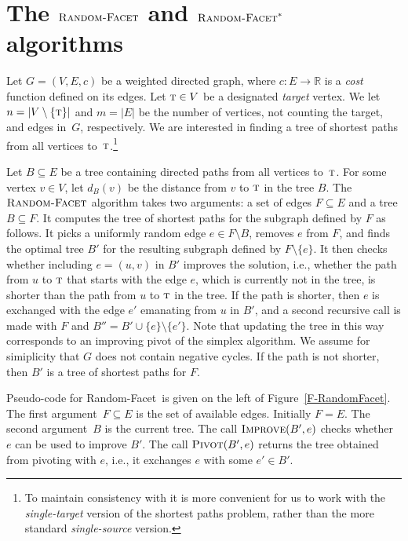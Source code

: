 \documentclass[twoside,11pt]{article}
\newcommand{\PIVOT}{\mbox{\sc Pivot}}
\newcommand{\IMPROVE}{\mbox{\sc Improve}}
\newcommand{\RR}{{\mathbb R}}
\newcommand{\mathsc}[1]{\mbox{\textsc #1}}
\newcommand{\TT}{{\mathsc t}}
\newcommand{\RandomFacet}{\mbox{\sc Random-}\allowbreak\mbox{\sc Facet}}
\begin{document}
\section{The $\RandomFacet$ and $\RandomFacet^*$ algorithms}\label{sec:algorithms}

Let $G=(V,E,c)$ be a weighted directed graph, where $c:E\to\RR$ is a \emph{cost} function defined on its edges. Let $\TT\in V$ be a designated \emph{target} vertex. We let $n=|V\setminus\{\TT\}|$ and $m=|E|$ be the number of vertices, not counting the target, and edges in~$G$, respectively. We are interested in finding a tree of shortest paths from all vertices to~$\TT$.\footnote{To maintain consistency with \cite{FriedmannHansenZwick/SODA11,FriedmannHansenZwick/STOC11} it is more convenient for us to work with the \emph{single-target} version of the shortest paths problem, rather than the more standard \emph{single-source} version.}

Let $B \subseteq E$ be a tree containing directed paths from all vertices to~$\TT$. For some vertex $v \in V$, let $d_B(v)$ be the distance from $v$ to $\TT$ in the tree $B$. The $\RandomFacet$ algorithm takes two arguments: a set of edges $F \subseteq E$ and a tree $B\subseteq F$. It computes the tree of shortest paths for the subgraph defined by $F$ as follows. It picks a uniformly random edge $e \in F \setminus B$, removes $e$ from $F$, and finds the optimal tree $B'$ for the resulting subgraph defined by $F \setminus \{e\}$. It then checks whether including $e=(u,v)$ in $B'$ improves the solution, i.e., whether the path from $u$ to $\TT$ that starts with the edge $e$, which is currently not in the tree, is shorter than the path from $u$ to $\TT$ in the tree. If the path is shorter, then $e$ is exchanged with the edge $e'$ emanating from $u$ in $B'$, and a second recursive call is made with $F$ and $B'' = B' \cup \{e\} \setminus \{e'\}$. Note that updating the tree in this way corresponds to an improving pivot of the simplex algorithm. We assume for simiplicity that $G$ does not contain negative cycles. If the path is not shorter, then $B'$ is a tree of shortest paths for $F$.

Pseudo-code for \RandomFacet\ is given on the left of Figure~\ref{F-RandomFacet}. The first argument~$F \subseteq E$
is the set of available edges. Initially $F=E$. The second argument~$B$ is the current tree.
The call $\IMPROVE(B',e)$ checks whether $e$ can be used to improve $B'$.
The call $\PIVOT(B',e)$ returns the tree obtained from pivoting with $e$, i.e., it exchanges $e$ with some $e'\in B'$.
\end{document}
